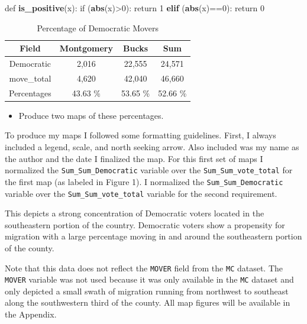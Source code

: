 \documentclass[]{article}
\newenvironment{Shaded}{\begin{snugshade}}{\end{snugshade}}
\newcommand{\KeywordTok}[1]{\textcolor[rgb]{0.13,0.29,0.53}{\textbf{{#1}}}}
\newcommand{\DecValTok}[1]{\textcolor[rgb]{0.00,0.00,0.81}{{#1}}}
\newcommand{\StringTok}[1]{\textcolor[rgb]{0.31,0.60,0.02}{{#1}}}
\newcommand{\NormalTok}[1]{{#1}}
\providecommand{\tightlist}{%
  \setlength{\itemsep}{0pt}\setlength{\parskip}{0pt}}
\begin{document}
\begin{Shaded}
\begin{Highlighting}[]
\NormalTok{def }\KeywordTok{is_positive}\NormalTok{(x):}
\StringTok{  }\NormalTok{if (}\KeywordTok{abs}\NormalTok{(x)>}\DecValTok{0}\NormalTok{):}
\StringTok{    }\NormalTok{return }\DecValTok{1}
  \KeywordTok{elif} \NormalTok{(}\KeywordTok{abs}\NormalTok{(x)==}\DecValTok{0}\NormalTok{):}
\StringTok{    }\NormalTok{return }\DecValTok{0} 
\end{Highlighting}
\end{Shaded}

\begin{table}[]
\centering
\caption{Percentage of Democratic Movers}
\label{my-label}
\begin{tabular}{cccc}
Field       & Montgomery & Bucks    & Sum      \\
\hline
Democratic  & 2,016      & 22,555   & 24,571   \\
move\_total & 4,620      & 42,040   & 46,660   \\
\hline
\hline
Percentages & 43.63 \%   & 53.65 \% & 52.66 \%
\end{tabular}
\end{table}

\begin{itemize}
\tightlist
\item
  Produce two maps of these percentages.
\end{itemize}

To produce my maps I followed some formatting guidelines. First, I
always included a legend, scale, and north seeking arrow. Also included
was my name as the author and the date I finalized the map. For this
first set of maps I normalized the \texttt{Sum\_Sum\_Democratic}
variable over the \texttt{Sum\_Sum\_vote\_total} for the first map (as
labeled in Figure 1). I normalized the \texttt{Sum\_Sum\_Democratic}
variable over the \texttt{Sum\_Sum\_vote\_total} variable for the second
requirement.

This depicts a strong concentration of Democratic voters located in the
southeastern portion of the country. Democratic voters show a propensity
for migration with a large percentage moving in and around the
southeastern portion of the county.

Note that this data does not reflect the \texttt{MOVER} field from the
\texttt{MC} dataset. The \texttt{MOVER} variable was not used because it
was only available in the \texttt{MC} dataset and only depicted a small
swath of migration running from northwest to southeast along the
southwestern third of the county. All map figures will be available in
the Appendix.
\end{document}
